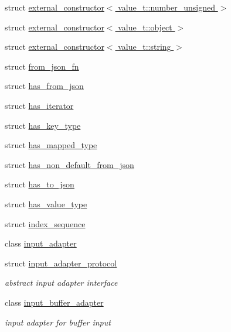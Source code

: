 \begin{DoxyCompactItemize}
\item 
struct \hyperlink{structnlohmann_1_1detail_1_1external__constructor_3_01value__t_1_1number__unsigned_01_4}{external\+\_\+constructor$<$ value\+\_\+t\+::number\+\_\+unsigned $>$}
\item 
struct \hyperlink{structnlohmann_1_1detail_1_1external__constructor_3_01value__t_1_1object_01_4}{external\+\_\+constructor$<$ value\+\_\+t\+::object $>$}
\item 
struct \hyperlink{structnlohmann_1_1detail_1_1external__constructor_3_01value__t_1_1string_01_4}{external\+\_\+constructor$<$ value\+\_\+t\+::string $>$}
\item 
struct \hyperlink{structnlohmann_1_1detail_1_1from__json__fn}{from\+\_\+json\+\_\+fn}
\item 
struct \hyperlink{structnlohmann_1_1detail_1_1has__from__json}{has\+\_\+from\+\_\+json}
\item 
struct \hyperlink{structnlohmann_1_1detail_1_1has__iterator}{has\+\_\+iterator}
\item 
struct \hyperlink{structnlohmann_1_1detail_1_1has__key__type}{has\+\_\+key\+\_\+type}
\item 
struct \hyperlink{structnlohmann_1_1detail_1_1has__mapped__type}{has\+\_\+mapped\+\_\+type}
\item 
struct \hyperlink{structnlohmann_1_1detail_1_1has__non__default__from__json}{has\+\_\+non\+\_\+default\+\_\+from\+\_\+json}
\item 
struct \hyperlink{structnlohmann_1_1detail_1_1has__to__json}{has\+\_\+to\+\_\+json}
\item 
struct \hyperlink{structnlohmann_1_1detail_1_1has__value__type}{has\+\_\+value\+\_\+type}
\item 
struct \hyperlink{structnlohmann_1_1detail_1_1index__sequence}{index\+\_\+sequence}
\item 
class \hyperlink{classnlohmann_1_1detail_1_1input__adapter}{input\+\_\+adapter}
\item 
struct \hyperlink{structnlohmann_1_1detail_1_1input__adapter__protocol}{input\+\_\+adapter\+\_\+protocol}
\begin{DoxyCompactList}\small\item\em abstract input adapter interface \end{DoxyCompactList}\item 
class \hyperlink{classnlohmann_1_1detail_1_1input__buffer__adapter}{input\+\_\+buffer\+\_\+adapter}
\begin{DoxyCompactList}\small\item\em input adapter for buffer input \end{DoxyCompactList}\item 

\end{DoxyCompactItemize}
